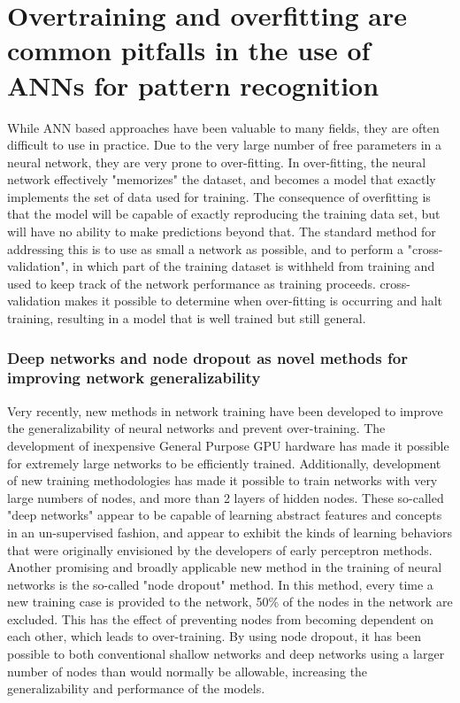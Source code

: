 
\section{Overtraining and overfitting are common pitfalls in the use of ANNs for pattern recognition}
While ANN based approaches have been valuable to many fields, they are often difficult to use in practice.
Due to the very large number of free parameters in a neural network, they are very prone to over-fitting.
In over-fitting, the neural network effectively "memorizes" the dataset, and becomes a model that exactly implements the set of data used for training\citep{Tetko:1995cm}.
The consequence of overfitting is that the model will be capable of exactly reproducing the training data set, but will have no ability to make predictions beyond that.
The standard method for addressing this is to use as small a network as possible, and to perform a "cross-validation", in which part of the training dataset is withheld from training and used to keep track of the network performance as training proceeds.
cross-validation makes it possible to determine when over-fitting is occurring and halt training, resulting in a model that is well trained but still general.

\subsubsection{Deep networks and node dropout as novel methods for improving network generalizability}
Very recently, new methods in network training have been developed to improve the generalizability of neural networks and prevent over-training.
The development of inexpensive General Purpose GPU hardware has made it possible for extremely large networks to be efficiently trained. 
Additionally, development of new training methodologies\citep{Hinton:2006dy} has made it possible to train networks with very large numbers of nodes, and more than 2 layers of hidden nodes.
These so-called "deep networks" appear to be capable of learning abstract features and concepts in an un-supervised fashion\citep{Le:2013kz}, and appear to exhibit the kinds of learning behaviors that were originally envisioned by the developers of early perceptron methods. 
Another promising and broadly applicable new method in the training of neural networks is the so-called "node dropout" method.
In this method, every time a new training case is provided to the network, 50\% of the nodes in the network are excluded.
This has the effect of preventing nodes from becoming dependent on each other, which leads to over-training.
By using node dropout, it has been possible to both conventional shallow networks and deep networks using a larger number of nodes than would normally be allowable, increasing the generalizability and performance of the models\citep{Hinton:2012tv}.

